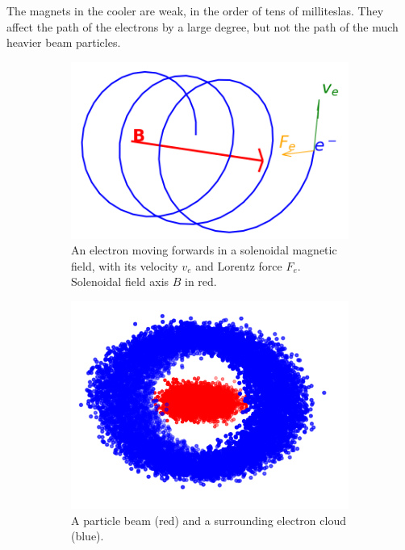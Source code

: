 The magnets in the cooler are weak, in the order of tens of milliteslas.
They affect the path of the electrons by a large degree, but
not the path of the much heavier beam particles.

\begin{figure}[!h]
    \centering
    \begin{subfigure}[b]{0.4\linewidth}
        \centering
        \includegraphics[width=0.9\linewidth]{figs/epath}
        \caption{An electron moving forwards in a solenoidal magnetic field,
        with its velocity $v_e$ and Lorentz force $F_e$. Solenoidal field axis $B$ in red.}
        \label{fig:epath}
    \end{subfigure}
    \hfill
    \begin{subfigure}[b]{0.4\linewidth}
        \centering
        \includegraphics[width=0.9\linewidth]{figs/ecloud}
        \caption{A particle beam (red) and a
        surrounding electron cloud (blue).}
        \label{fig:ecloud}
    \end{subfigure}
    \caption{}
\end{figure}

